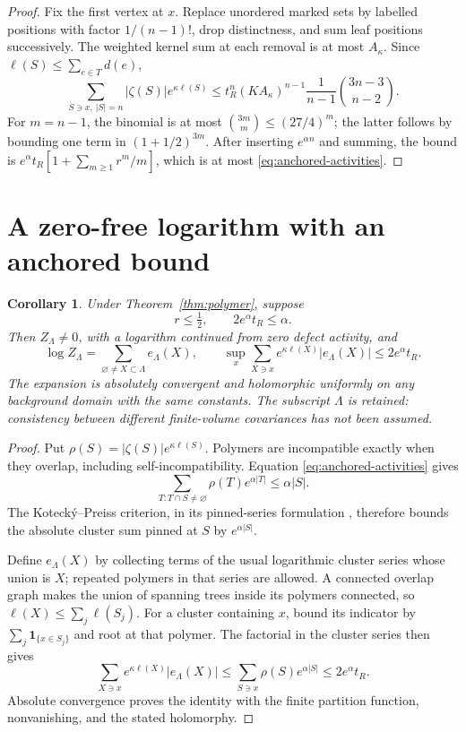 \documentclass[11pt]{article}
\newtheorem{corollary}[theorem]{Corollary}
\theoremstyle{remark}
\begin{document}
\begin{proof}
Fix the first vertex at $x$. Replace unordered marked sets by labelled
positions with factor $1/(n-1)!$, drop distinctness, and sum leaf
positions successively. The weighted kernel sum at each removal is
at most $A_\kappa$. Since $\ell(S)\le\sum_{e\in T}d(e)$,
\[
 \sum_{S\ni x,\ |S|=n}|\zeta(S)|e^{\kappa\ell(S)}
 \le t_R^n(KA_\kappa)^{n-1}
       \frac{1}{n-1}\binom{3n-3}{n-2}.
\]
For $m=n-1$, the binomial is at most
$\binom{3m}{m}\le(27/4)^m$; the latter follows by bounding one
term in $(1+1/2)^{3m}$. After inserting $e^{\alpha n}$ and summing,
the bound is $e^\alpha t_R[1+\sum_{m\ge1}r^m/m]$, which is at most
\eqref{eq:anchored-activities}.
\end{proof}

\section{A zero-free logarithm with an anchored bound}

\begin{corollary}\label{cor:log}
Under Theorem~\ref{thm:polymer}, suppose
\begin{equation}\label{eq:smallness}
 r\le\tfrac12,\qquad 2e^\alpha t_R\le\alpha.
\end{equation}
Then $Z_\Lambda\ne0$, with a logarithm continued from zero defect
activity, and
\[
 \log Z_\Lambda=\sum_{\varnothing\ne X\subset\Lambda}e_\Lambda(X),
 \qquad
 \sup_x\sum_{X\ni x}e^{\kappa\ell(X)}|e_\Lambda(X)|
 \le2e^\alpha t_R.
\]
The expansion is absolutely convergent and holomorphic uniformly on
any background domain with the same constants. The subscript $\Lambda$
is retained: consistency between different finite-volume covariances
has not been assumed.
\end{corollary}

\begin{proof}
Put $\rho(S)=|\zeta(S)|e^{\kappa\ell(S)}$. Polymers are incompatible
exactly when they overlap, including self-incompatibility. Equation
\eqref{eq:anchored-activities} gives
\[
 \sum_{T:T\cap S\ne\varnothing}\rho(T)e^{\alpha|T|}
 \le\alpha|S|.
\]
The Koteck\'y--Preiss criterion, in its pinned-series formulation
\cite{kp,fp}, therefore bounds the absolute cluster sum pinned at $S$
by $e^{\alpha|S|}$.

Define $e_\Lambda(X)$ by collecting terms of the usual logarithmic
cluster series whose union is $X$; repeated polymers in that series
are allowed. A connected overlap graph makes the union of spanning
trees inside its polymers connected, so
$\ell(X)\le\sum_j\ell(S_j)$. For a cluster containing $x$,
bound its indicator by $\sum_j\mathbf1_{\{x\in S_j\}}$ and root
at that polymer. The factorial in the cluster series then gives
\[
 \sum_{X\ni x}e^{\kappa\ell(X)}|e_\Lambda(X)|
 \le\sum_{S\ni x}\rho(S)e^{\alpha|S|}
 \le2e^\alpha t_R.
\]
Absolute convergence proves the identity with the finite partition
function, nonvanishing, and the stated holomorphy.
\end{proof}
\end{document}
